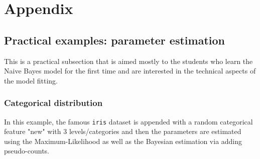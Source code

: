 \documentclass{article}\usepackage[]{graphicx}\usepackage[]{color}
\begin{document}
\break

\section{Appendix}

\subsection{Practical examples: parameter estimation}

This is a practical subsection that is aimed mostly to the students who learn the Naive Bayes model for the first time and are interested in the technical aspects of the model fitting.

\subsubsection{Categorical distribution}

In this example, the famous \texttt{iris} dataset is appended with a random categorical feature "new" with 3 levels/categories and then the parameters are estimated using the Maximum-Likelihood as well as the Bayesian estimation via adding pseudo-counts.
\end{document}
